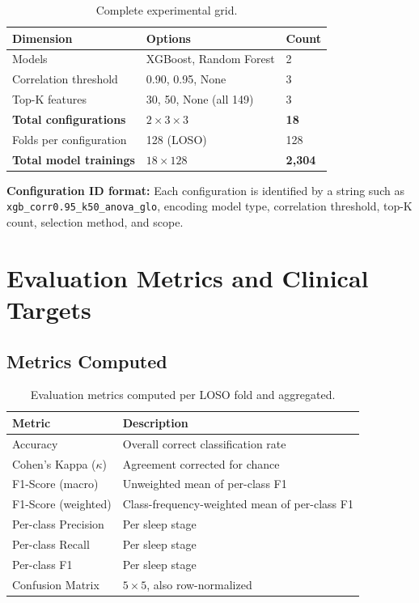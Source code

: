 \begin{table}[h]
\centering
\caption{Complete experimental grid.}
\label{tab:exp_grid}
\begin{tabular}{l l l}
\toprule
\textbf{Dimension} & \textbf{Options} & \textbf{Count} \\
\midrule
Models              & XGBoost, Random Forest         & 2 \\
Correlation threshold & 0.90, 0.95, None             & 3 \\
Top-K features      & 30, 50, None (all 149)         & 3 \\
\midrule
\textbf{Total configurations} & $2 \times 3 \times 3$ & \textbf{18} \\
Folds per configuration & 128 (LOSO)                 & 128 \\
\textbf{Total model trainings} & $18 \times 128$      & \textbf{2{,}304} \\
\bottomrule
\end{tabular}
\end{table}

\textbf{Configuration ID format:} Each configuration is identified by a string such as \texttt{xgb\_corr0.95\_k50\_anova\_glo}, encoding model type, correlation threshold, top-K count, selection method, and scope.

\section{Evaluation Metrics and Clinical Targets}
\label{sec:app_evaluation}

\subsection{Metrics Computed}

\begin{table}[h]
\centering
\caption{Evaluation metrics computed per LOSO fold and aggregated.}
\label{tab:metrics}
\begin{tabular}{l l}
\toprule
\textbf{Metric} & \textbf{Description} \\
\midrule
Accuracy                & Overall correct classification rate \\
Cohen's Kappa ($\kappa$) & Agreement corrected for chance \\
F1-Score (macro)        & Unweighted mean of per-class F1 \\
F1-Score (weighted)     & Class-frequency-weighted mean of per-class F1 \\
Per-class Precision     & Per sleep stage \\
Per-class Recall        & Per sleep stage \\
Per-class F1            & Per sleep stage \\
Confusion Matrix        & $5 \times 5$, also row-normalized \\
\bottomrule
\end{tabular}
\end{table}

